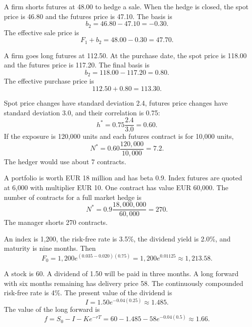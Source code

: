 \begin{exmp}
A firm shorts futures at 48.00 to hedge a sale. When the hedge is closed, the
spot price is 46.80 and the futures price is 47.10. The basis is
\[
    b_2=46.80-47.10=-0.30.
\]
The effective sale price is
\[
    F_1+b_2=48.00-0.30=47.70.
\]
\end{exmp}

\begin{exmp}
A firm goes long futures at 112.50. At the purchase date, the spot price is
118.00 and the futures price is 117.20. The final basis is
\[
    b_2=118.00-117.20=0.80.
\]
The effective purchase price is
\[
    112.50+0.80=113.30.
\]
\end{exmp}

\begin{exmp}
Spot price changes have standard deviation 2.4, futures price changes have
standard deviation 3.0, and their correlation is 0.75:
\[
    h^*=0.75\frac{2.4}{3.0}=0.60.
\]
If the exposure is 120,000 units and each futures contract is for 10,000 units,
\[
    N^*=0.60\frac{120{,}000}{10{,}000}=7.2.
\]
The hedger would use about 7 contracts.
\end{exmp}

\begin{exmp}
A portfolio is worth EUR 18 million and has beta 0.9. Index futures are quoted
at 6,000 with multiplier EUR 10. One contract has value EUR 60,000. The number
of contracts for a full market hedge is
\[
    N^*=0.9\frac{18{,}000{,}000}{60{,}000}=270.
\]
The manager shorts 270 contracts.
\end{exmp}

\begin{exmp}
An index is 1,200, the risk-free rate is 3.5\%, the dividend yield is 2.0\%, and
maturity is nine months. Then
\[
    F_0=1{,}200e^{(0.035-0.020)(0.75)}
    =
    1{,}200e^{0.01125}
    \approx 1{,}213.58.
\]
\end{exmp}

\begin{exmp}
A stock is 60. A dividend of 1.50 will be paid in three months. A long forward
with six months remaining has delivery price 58. The continuously compounded
risk-free rate is 4\%. The present value of the dividend is
\[
    I=1.50e^{-0.04(0.25)}\approx 1.485.
\]
The value of the long forward is
\[
    f=S_0-I-Ke^{-rT}
    =
    60-1.485-58e^{-0.04(0.5)}
    \approx 1.66.
\]
\end{exmp}

